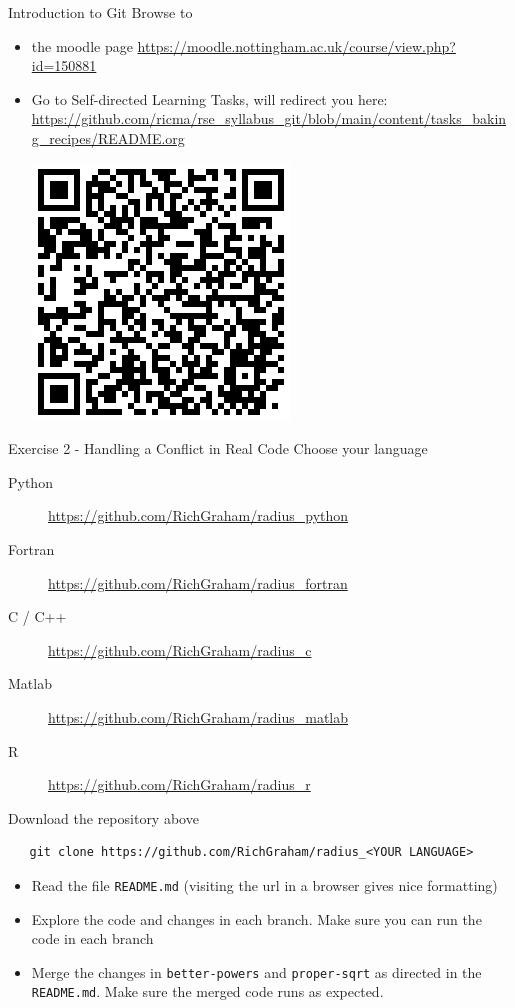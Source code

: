 \documentclass[presentation, smaller, aspectratio=169]{beamer}
\begin{document}
\begin{frame}[label={sec:org618c8b0}]{Introduction to Git}
Browse to
\begin{itemize}
\item the moodle page
\url{https://moodle.nottingham.ac.uk/course/view.php?id=150881}
\item Go to \alert{Self-directed Learning Tasks}, will redirect you here:
\url{https://github.com/ricma/rse\_syllabus\_git/blob/main/content/tasks\_baking\_recipes/README.org}
\begin{center}
\includegraphics[width=0.3\columnwidth]{./figures/qr_sdlts.png}
\label{}
\end{center}
\end{itemize}
\end{frame}
\begin{frame}[label={sec:org9a13fb0},fragile]{Exercise 2 - Handling a Conflict in Real Code}
 Choose your language
\begin{description}
\item[{Python}] \url{https://github.com/RichGraham/radius\_python}
\item[{Fortran}] \url{https://github.com/RichGraham/radius\_fortran}
\item[{C / C++}] \url{https://github.com/RichGraham/radius\_c}
\item[{Matlab}] \url{https://github.com/RichGraham/radius\_matlab}
\item[{R}] \url{https://github.com/RichGraham/radius\_r}
\end{description}

Download the repository above
\begin{verbatim}
   git clone https://github.com/RichGraham/radius_<YOUR LANGUAGE>
\end{verbatim}

\begin{itemize}
\item Read the ﬁle \texttt{README.md} (visiting the url in a browser gives nice formatting)
\item Explore the code and changes in each branch. Make sure you can
run the code in each branch
\item \alert{Merge} the changes in \texttt{better-powers} and \texttt{proper-sqrt} as directed in the
\texttt{README.md}. Make sure the merged code runs as expected.
\end{itemize}
\end{frame}
\end{document}
